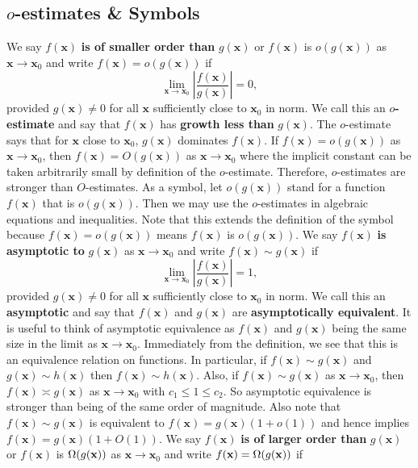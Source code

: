     \subsection*{\texorpdfstring{$o$}{o}-estimates \& Symbols}
      We say $f(\mathbf{x})$ \textbf{is of smaller order than} $g(\mathbf{x})$ or $f(\mathbf{x})$ is $o(g(\mathbf{x}))$ as $\mathbf{x} \to \mathbf{x}_{0}$ and write $f(\mathbf{x}) = o(g(\mathbf{x}))$ if
      \[
        \lim_{\mathbf{x} \to \mathbf{x}_{0}}\left|\frac{f(\mathbf{x})}{g(\mathbf{x})}\right| = 0,
      \]
      provided $g(\mathbf{x}) \neq 0$ for all $\mathbf{x}$ sufficiently close to $\mathbf{x}_{0}$ in norm. We call this an \textbf{$o$-estimate} and say that $f(\mathbf{x})$ has \textbf{growth less than} $g(\mathbf{x})$. The $o$-estimate says that for $\mathbf{x}$ close to $\mathbf{x}_{0}$, $g(\mathbf{x})$ dominates $f(\mathbf{x})$. If $f(\mathbf{x}) = o(g(\mathbf{x}))$ as $\mathbf{x} \to \mathbf{x}_{0}$, then $f(\mathbf{x}) = O(g(\mathbf{x}))$ as $\mathbf{x} \to \mathbf{x}_{0}$ where the implicit constant can be taken arbitrarily small by definition of the $o$-estimate. Therefore, $o$-estimates are stronger than $O$-estimates. As a symbol, let $o(g(\mathbf{x}))$ stand for a function $f(\mathbf{x})$ that is $o(g(\mathbf{x}))$. Then we may use the $o$-estimates in algebraic equations and inequalities. Note that this extends the definition of the symbol because $f(\mathbf{x}) = o(g(\mathbf{x}))$ means $f(\mathbf{x})$ is $o(g(\mathbf{x}))$. We say $f(\mathbf{x})$ \textbf{is asymptotic to} $g(\mathbf{x})$ as $\mathbf{x} \to \mathbf{x}_{0}$ and write $f(\mathbf{x}) \sim g(\mathbf{x})$ if
      \[
        \lim_{\mathbf{x} \to \mathbf{x}_{0}}\left|\frac{f(\mathbf{x})}{g(\mathbf{x})}\right| = 1,
      \]
      provided $g(\mathbf{x}) \neq 0$ for all $\mathbf{x}$ sufficiently close to $\mathbf{x}_{0}$ in norm. We call this an \textbf{asymptotic} and say that $f(\mathbf{x})$ and $g(\mathbf{x})$ are \textbf{asymptotically equivalent}. It is useful to think of asymptotic equivalence as $f(\mathbf{x})$ and $g(\mathbf{x})$ being the same size in the limit as $\mathbf{x} \to \mathbf{x}_{0}$. Immediately from the definition, we see that this is an equivalence relation on functions. In particular, if $f(\mathbf{x}) \sim g(\mathbf{x})$ and $g(\mathbf{x}) \sim h(\mathbf{x})$ then $f(\mathbf{x}) \sim h(\mathbf{x})$. Also, if $f(\mathbf{x}) \sim g(\mathbf{x})$ as $\mathbf{x} \to \mathbf{x}_{0}$, then $f(\mathbf{x}) \asymp g(\mathbf{x})$ as $\mathbf{x} \to \mathbf{x}_{0}$ with $c_{1} \le 1 \le c_{2}$. So asymptotic equivalence is stronger than being of the same order of magnitude. Also note that $f(\mathbf{x}) \sim g(\mathbf{x})$ is equivalent to $f(\mathbf{x}) = g(\mathbf{x})(1+o(1))$ and hence implies $f(\mathbf{x}) = g(\mathbf{x})(1+O(1))$. We say $f(\mathbf{x})$ \textbf{is of larger order than} $g(\mathbf{x})$ or $f(\mathbf{x})$ is $\Omega(g(\mathbf{x}))$ as $\mathbf{x} \to \mathbf{x}_{0}$ and write $f(\mathbf{x}) = \Omega(g(\mathbf{x}))$ if
